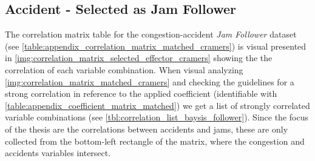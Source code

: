 \subsection{Accident - Selected as Jam Follower}
\label{analysis_processing_correlation_baysis_follower}
The correlation matrix table for the congestion-accident \textit{Jam Follower} dataset (see \cref{table:appendix_correlation_matrix_matched_cramers}) is visual presented in \cref{img:correlation_matrix_selected_effector_cramers} showing the the correlation of each variable combination. When visual analyzing \cref{img:correlation_matrix_matched_cramers} and checking the guidelines for a strong correlation in reference to the applied coefficient (identifiable with \cref{table:appendix_coefficient_matrix_matched}) we get a list of strongly correlated variable combinations (see \cref{tbl:correlation_list_baysis_follower}). Since the focus of the thesis are the correlations between accidents and jams, these are only collected from the bottom-left rectangle of the matrix, where the congestion and accidents variables intersect.
